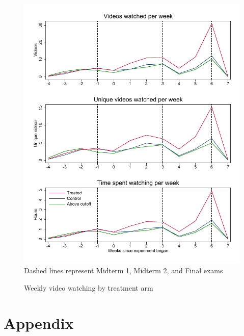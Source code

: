 \documentclass[12pt]{article}
\begin{document}
\clearpage
\begin{figure}[t]
\begin{center}
\caption{Weekly video watching by treatment arm}
\includegraphics[width=1\textwidth, angle=0]{../plots/tscombo.pdf}
\footnotesize Dashed lines represent Midterm 1, Midterm 2, and Final exams
\end{center}
\end{figure}



\clearpage

\section*{Appendix}

\renewcommand{\thesubsection}{\Alph{subsection}}

\setcounter{table}{0}
\renewcommand{\thetable}{A\arabic{table}}
\setcounter{figure}{0}
\renewcommand{\thefigure}{A\arabic{figure}}
\end{document}

